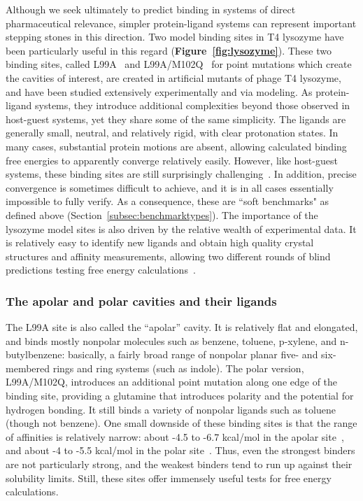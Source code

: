 \documentclass[aps,pre,twocolumn,nofootinbib,superscriptaddress,10pt, final,tightenlines]{revtex4-1}
\begin{document}
Although we seek ultimately to predict binding in systems of direct pharmaceutical relevance, simpler protein-ligand systems can represent important stepping stones in this direction.
Two model binding sites in T4 lysozyme have been particularly useful in this regard ({\bf Figure~\ref{fig:lysozyme}}). 
These two binding sites, called L99A~\cite{morton_energetic_1995, morton_specificity_1995} and L99A/M102Q~\cite{wei_model_2002, graves_decoys_2005} for point mutations which create the cavities of interest, are created in artificial mutants of phage T4 lysozyme, and have been studied extensively experimentally and via modeling. 
As protein-ligand systems, they introduce additional complexities beyond those observed in host-guest systems, yet they share some of the same simplicity.
The ligands are generally small, neutral, and relatively rigid, with clear protonation states.
In many cases, substantial protein motions are absent, allowing calculated binding free energies to apparently converge relatively easily. 
However, like host-guest systems, these binding sites are still surprisingly challenging~\cite{mobley_use_2006, mobley_confine_2007, mobley_predicting_2007, boyce_predicting_2009, jiang_free_2010, gallicchio_binding_2010, lim_sensitivity_2016}. In addition, precise convergence is sometimes difficult to achieve, and it is in all cases essentially impossible to fully verify.  As a consequence, these are ``soft benchmarks" as defined above (Section~\ref{subsec:benchmarktypes}).
The importance of the lysozyme model sites is also driven by the relative wealth of experimental data. 
It is relatively easy to identify new ligands and obtain high quality crystal structures and affinity measurements, allowing two different rounds of blind predictions testing free energy calculations~\cite{mobley_predicting_2007, boyce_predicting_2009}. 


\subsubsection{The apolar and polar cavities and their ligands}
The L99A site is also called the ``apolar'' cavity. It is relatively flat and elongated, and binds mostly nonpolar molecules such as benzene, toluene, p-xylene, and n-butylbenzene: basically, a fairly broad range of nonpolar planar five- and six-membered rings and ring systems (such as indole).
The polar version, L99A/M102Q, introduces an additional point mutation along one edge of the binding site, providing a glutamine that introduces polarity and the potential for hydrogen bonding. 
It still binds a variety of nonpolar ligands such as toluene (though not benzene). 
One small downside of these binding sites is that the range of affinities is relatively narrow: about -4.5 to -6.7 kcal/mol in the apolar site~\cite{morton_energetic_1995, mobley_predicting_2007}, and about -4 to -5.5 kcal/mol in the polar site~\cite{boyce_predicting_2009}. Thus, even the strongest binders are not particularly strong, and the weakest binders tend to run up against their solubility limits. 
Still, these sites offer immensely useful tests for free energy calculations.
\end{document}
